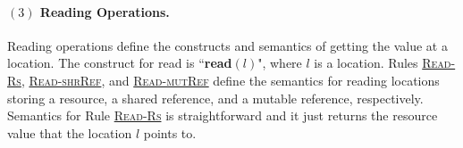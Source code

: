 \documentclass[runningheads]{llncs}
\def\refrule#1{\hyperref[#1]{\textsc{#1}}}
\newcommand{\terminal}[1]{\textbf{#1}}
\newcommand{\cfg}[1]{\langle #1\rangle}
\begin{document}
\paragraph{$(3)$ Reading Operations.}
Reading operations define the constructs and semantics of getting the value at a location.
The construct for read is ``\terminal{read}$(l)$", where $l$ is a location.
Rules \refrule{Read-Rs}, \refrule{Read-shrRef}, and \refrule{Read-mutRef} define
 the semantics for reading locations storing a resource, a shared reference, and a mutable reference, respectively.
 Semantics for Rule \refrule{Read-Rs} is straightforward and it just returns the resource value that the location $l$ points to.
 
\end{document}
